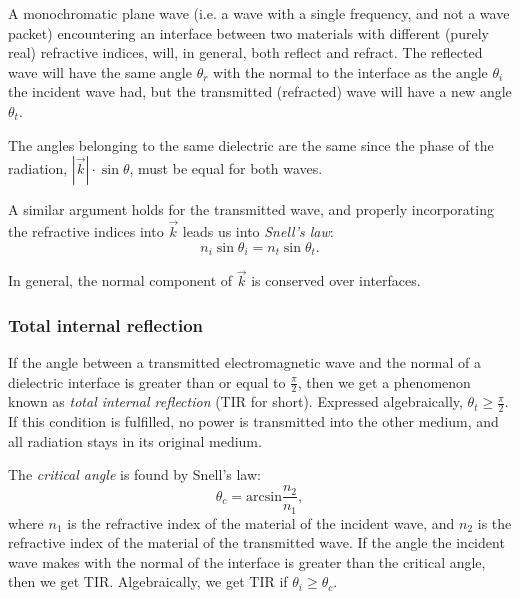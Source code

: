     A monochromatic plane wave (i.e. a wave with a single frequency, and not a wave packet) 
    encountering an interface between two materials with different (purely real) refractive indices, will, in general, both reflect and refract. 
    The reflected wave will have the same angle $\theta_r$ with the normal to the interface as the angle $\theta_i$ the incident wave had, 
    but the transmitted (refracted) wave will have a new angle $\theta_t$. 

    The angles belonging to the same dielectric are the same since the phase of the radiation, 
    $|\vec{k}|\cdot\sin\theta$, must be equal for both waves. 

    A similar argument holds for the transmitted wave, and properly incorporating the refractive indices into $\vec{k}$ leads us into
    \textit{Snell's law}:
    \begin{equation}
        n_i\sin\theta_i = n_t\sin\theta_t.
    \end{equation}

    In general, the normal component of $\vec{k}$ is conserved over interfaces.

    \subsubsection*{Total internal reflection}
        If the angle between a transmitted electromagnetic wave and the normal of a dielectric interface is greater than or equal to $\frac{\pi}{2}$, 
        then we get a phenomenon known as \textit{total internal reflection} (TIR for short). 
        Expressed algebraically, $\theta_t \geq \frac{\pi}{2}$.
        If this condition is fulfilled, no power is transmitted into the other medium, and all radiation stays in its original medium.

        The \textit{critical angle} is found by Snell's law:
        \begin{equation}
            \theta_c = \text{arcsin}\frac{n_2}{n_1},
        \end{equation}
        where $n_1$ is the refractive index of the material of the incident wave, and $n_2$ is the refractive index of the material of the transmitted wave.
        If the angle the incident wave makes with the normal of the interface is greater than the critical angle, then we get TIR. 
        Algebraically, we get TIR if $\theta_i \geq \theta_c$. 
